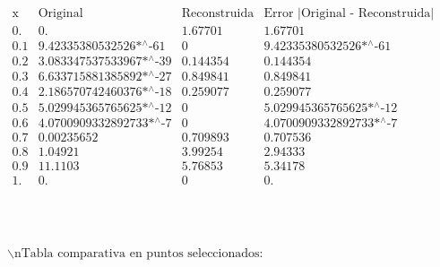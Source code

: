 \documentclass{article}
\begin{document}
\noindent\(\begin{array}{cccc}
 \text{x} & \text{Original} & \text{Reconstruida} & \text{Error $|$Original - Reconstruida$|$} \\
 0. & 0. & 1.67701 & 1.67701 \\
 0.1 & \text{9.42335380532526$\grave{ }$*${}^{\wedge}$-61} & 0 & \text{9.42335380532526$\grave{ }$*${}^{\wedge}$-61} \\
 0.2 & \text{3.083347537533967$\grave{ }$*${}^{\wedge}$-39} & 0.144354 & 0.144354 \\
 0.3 & \text{6.633715881385892$\grave{ }$*${}^{\wedge}$-27} & 0.849841 & 0.849841 \\
 0.4 & \text{2.186570742460376$\grave{ }$*${}^{\wedge}$-18} & 0.259077 & 0.259077 \\
 0.5 & \text{5.029945365765625$\grave{ }$*${}^{\wedge}$-12} & 0 & \text{5.029945365765625$\grave{ }$*${}^{\wedge}$-12} \\
 0.6 & \text{4.0700909332892733$\grave{ }$*${}^{\wedge}$-7} & 0 & \text{4.0700909332892733$\grave{ }$*${}^{\wedge}$-7} \\
 0.7 & 0.00235652 & 0.709893 & 0.707536 \\
 0.8 & 1.04921 & 3.99254 & 2.94333 \\
 0.9 & 11.1103 & 5.76853 & 5.34178 \\
 1. & 0. & 0 & 0. \\
\end{array}\)

\noindent\(\begin{array}{cc}
 
\begin{array}{cc}
  &  \\
\end{array}
 &  \\
\end{array}\)

\noindent\(\text{$\backslash $nTabla comparativa en puntos seleccionados:}\)
\end{document}
